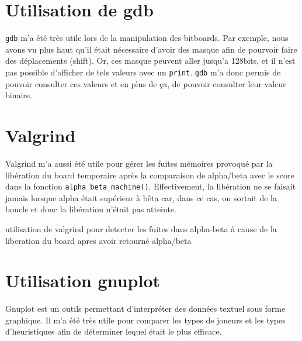 \documentclass{report}
\begin{document}
\section{Utilisation de gdb}
\texttt{gdb} m'a été très utile lors de la manipulation des bitboards. Par exemple, nous avons vu plus haut qu'il était nécessaire d'avoir des masque afin de pourvoir faire des déplacements (shift). Or, ces masque peuvent aller jusqu'a 128bits, et il n'est pas possible d'afficher de tels valeurs avec un \texttt{print}. \texttt{gdb} m'a donc permis de pouvoir consulter ces valeurs et en plus de ça, de pouvoir consulter leur valeur binaire.


\section{Valgrind}
Valgrind m'a aussi été utile pour gérer les fuites mémoires provoqué par la libération du board temporaire après la comparaison de alpha/beta avec le score dans la fonction \texttt{alpha\_beta\_machine()}. Effectivement, la libération ne se faisait jamais lorsque alpha était supérieur à bêta car, dans ce cas, on sortait de la boucle et donc la libération n'était pas atteinte.

utilisation de valgrind pour detecter les fuites dans alpha-beta à cause de la liberation du board apres avoir retourné alpha/beta

\section{Utilisation gnuplot}
Gnuplot est un outils permettant d'interpréter des données textuel sous forme graphique. Il m'a été très utile pour comparer les types de joueurs et les types d'heuristiques afin de déterminer lequel était le plus efficace.

\appendix
\end{document}
